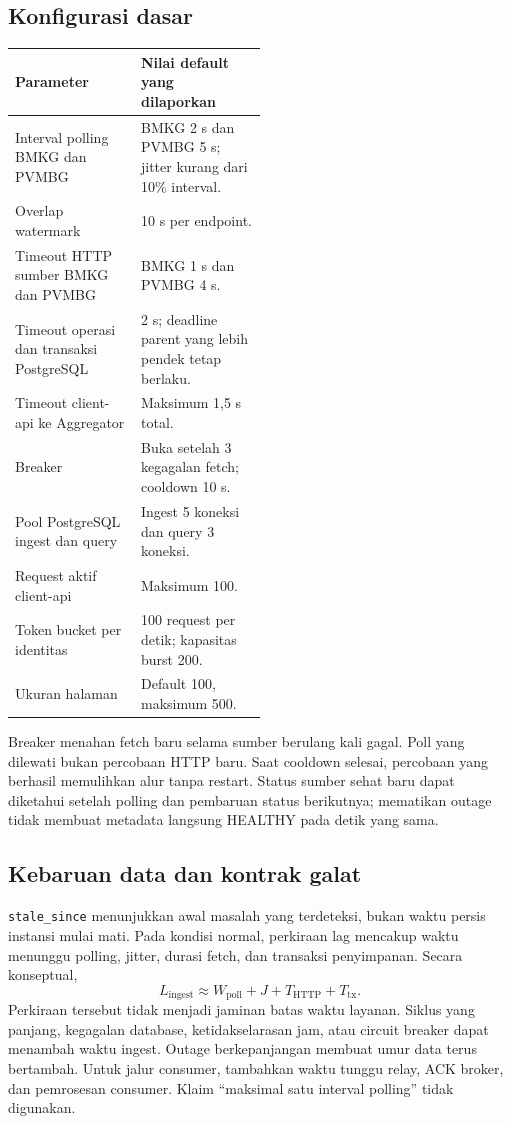 \subsection{Konfigurasi dasar}
\begin{tabularx}{\linewidth}{P{0.50\linewidth}Y}
\toprule Parameter & Nilai default yang dilaporkan\\\midrule
Interval polling BMKG dan PVMBG & BMKG 2 s dan PVMBG 5 s; jitter kurang dari 10\% interval.\\
Overlap watermark & 10 s per endpoint.\\
Timeout HTTP sumber BMKG dan PVMBG & BMKG 1 s dan PVMBG 4 s.\\
Timeout operasi dan transaksi PostgreSQL & 2 s; deadline parent yang lebih pendek tetap berlaku.\\
Timeout client-api ke Aggregator & Maksimum 1,5 s total.\\
Breaker & Buka setelah 3 kegagalan fetch; cooldown 10 s.\\
Pool PostgreSQL ingest dan query & Ingest 5 koneksi dan query 3 koneksi.\\
Request aktif client-api & Maksimum 100.\\
Token bucket per identitas & 100 request per detik; kapasitas burst 200.\\
Ukuran halaman & Default 100, maksimum 500.\\
\bottomrule
\end{tabularx}

Breaker menahan fetch baru selama sumber berulang kali gagal. Poll yang dilewati bukan percobaan HTTP baru. Saat cooldown selesai, percobaan yang berhasil memulihkan alur tanpa restart. Status sumber sehat baru dapat diketahui setelah polling dan pembaruan status berikutnya; mematikan outage tidak membuat metadata langsung HEALTHY pada detik yang sama.

\subsection{Kebaruan data dan kontrak galat}
\texttt{stale\_since} menunjukkan awal masalah yang terdeteksi, bukan waktu persis instansi mulai mati. Pada kondisi normal, perkiraan lag mencakup waktu menunggu polling, jitter, durasi fetch, dan transaksi penyimpanan. Secara konseptual,
\[
L_{\mathrm{ingest}} \approx W_{\mathrm{poll}}+J+T_{\mathrm{HTTP}}+T_{\mathrm{tx}}.
\]
Perkiraan tersebut tidak menjadi jaminan batas waktu layanan. Siklus yang panjang, kegagalan database, ketidakselarasan jam, atau circuit breaker dapat menambah waktu ingest. Outage berkepanjangan membuat umur data terus bertambah. Untuk jalur consumer, tambahkan waktu tunggu relay, ACK broker, dan pemrosesan consumer. Klaim ``maksimal satu interval polling'' tidak digunakan.

